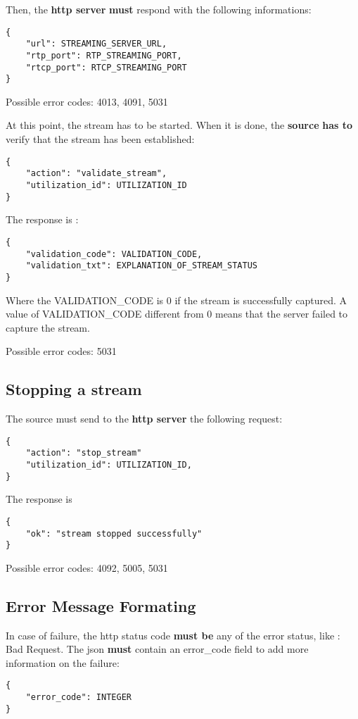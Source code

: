 Then, the {\bfseries http server} {\bfseries must} respond with the following informations\-: \begin{verbatim}{
    "url": STREAMING_SERVER_URL,
    "rtp_port": RTP_STREAMING_PORT,
    "rtcp_port": RTCP_STREAMING_PORT
}
\end{verbatim}


Possible error codes\-: 4013, 4091, 5031

At this point, the stream has to be started. When it is done, the {\bfseries source} {\bfseries has to} verify that the stream has been established\-: \begin{verbatim}{
    "action": "validate_stream",
    "utilization_id": UTILIZATION_ID
}
\end{verbatim}


The response is \-: \begin{verbatim}{
    "validation_code": VALIDATION_CODE,
    "validation_txt": EXPLANATION_OF_STREAM_STATUS
}
\end{verbatim}


Where the {\ttfamily V\-A\-L\-I\-D\-A\-T\-I\-O\-N\-\_\-\-C\-O\-D\-E} is 0 if the stream is successfully captured. A value of {\ttfamily V\-A\-L\-I\-D\-A\-T\-I\-O\-N\-\_\-\-C\-O\-D\-E} different from 0 means that the server failed to capture the stream.

Possible error codes\-: 5031

\subsection*{Stopping a stream }

The source must send to the {\bfseries http server} the following request\-: \begin{verbatim}{
    "action": "stop_stream"
    "utilization_id": UTILIZATION_ID,
}
\end{verbatim}


The response is \begin{verbatim}{
    "ok": "stream stopped successfully"
}
\end{verbatim}


Possible error codes\-: 4092, 5005, 5031 

\subsection*{Error Message Formating }

In case of failure, the http status code {\bfseries must be} any of the error status, like {\-: Bad Request}. The json {\bfseries must} contain an {\ttfamily error\-\_\-code} field to add more information on the failure\-: \begin{verbatim}{
    "error_code": INTEGER
}
\end{verbatim}


